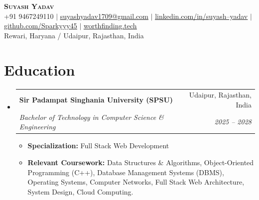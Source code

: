 \documentclass[letterpaper,10.8pt]{article}
\makeatletter
\newcommand{\resumeItem}[1]{
  \item\small{
    {#1 \vspace{-2pt}}
  }
}
\newcommand{\resumeSubheading}[4]{
  \vspace{-2pt}\item
    \begin{tabular*}{0.97\textwidth}[t]{l@{\extracolsep{\fill}}r}
      \textbf{#1} & #2 \\
      \textit{\small#3} & \textit{\small #4} \\
    \end{tabular*}\vspace{-6pt}
}
\newcommand{\resumeSubHeadingListStart}{\begin{itemize}[leftmargin=0.15in, label={}]}
\newcommand{\resumeSubHeadingListEnd}{\end{itemize}}
\newcommand{\resumeItemListStart}{\begin{itemize}[leftmargin=0.15in]}
\newcommand{\resumeItemListEnd}{\end{itemize}\vspace{-4pt}}
\makeatother
\begin{document}
\begin{center}
    \textbf{\Huge \scshape Suyash Yadav} \\ \vspace{2pt}
    \small +91 9467249110 $|$ 
    \href{mailto:suyashyadav1709@gmail.com}{\underline{suyashyadav1709@gmail.com}} $|$ 
    \href{https://linkedin.com/in/suyash--yadav}{\underline{linkedin.com/in/suyash--yadav}} $|$
    \href{https://github.com/Sparkyyy45}{\underline{github.com/Sparkyyy45}} $|$
    \href{https://worthfinding.tech}{\underline{worthfinding.tech}} \\
    \small Rewari, Haryana / Udaipur, Rajasthan, India
\end{center}


\section{Education}
  \resumeSubHeadingListStart
    \resumeSubheading
      {Sir Padampat Singhania University (SPSU)}{Udaipur, Rajasthan, India}
      {Bachelor of Technology in Computer Science \& Engineering}{2025 -- 2028}
      \resumeItemListStart
        \resumeItem{\textbf{Specialization:} Full Stack Web Development}
        \resumeItem{\textbf{Relevant Coursework:} Data Structures \& Algorithms, Object-Oriented Programming (C++), Database Management Systems (DBMS), Operating Systems, Computer Networks, Full Stack Web Architecture, System Design, Cloud Computing.}
      \resumeItemListEnd
  \resumeSubHeadingListEnd


\end{document}
